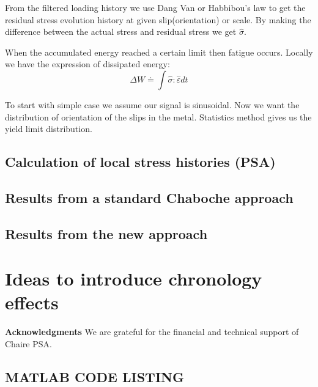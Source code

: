 \documentclass[3p,times,procedia,number]{elsarticle}
\begin{document}
From the filtered loading history we use Dang Van or Habbibou's law to get the residual stress evolution history at given slip(orientation) or scale. By making the difference between the actual stress and residual stress we get $\hat{\sigma}$. 

When the accumulated energy reached a certain limit then fatigue occurs. Locally we have the expression of dissipated energy:
$$\Delta W\doteq\int\hat{\sigma}:\hat{\varepsilon}dt$$

To start with simple case we assume our signal is sinusoidal. Now we want the distribution of orientation of the slips in the metal. Statistics method gives us the yield limit distribution.

\subsection{Calculation of local stress histories (PSA)}
\subsection{Results from a standard Chaboche approach}
\subsection{Results from the new approach}
\section{Ideas to introduce chronology effects}

\vspace{6pt}
\noindent
\textbf{Acknowledgments}
\vspace{6pt}
We are grateful for the financial and technical support of Chaire PSA.


\clearpage




\clearpage
\appendix
\appendixpage
{}
\begin{subappendices}
	\section{MATLAB CODE LISTING}
	
	
\end{subappendices}
\end{document}
